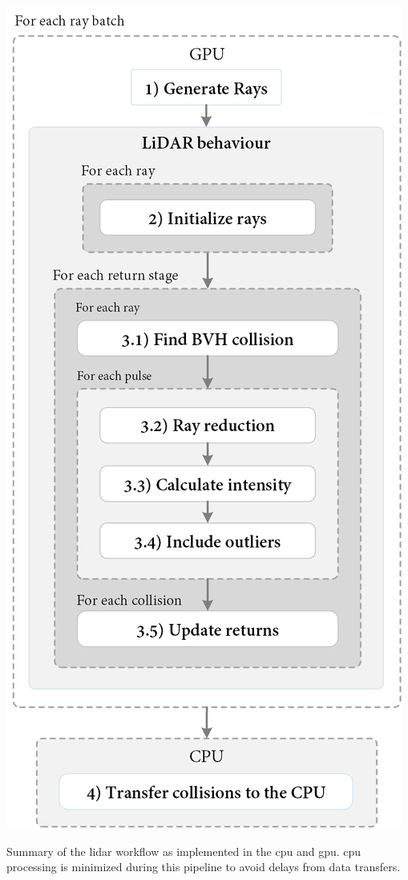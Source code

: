 \begin{marginfigure}[.0cm]
	\centering
	\includegraphics[width=\linewidth]{figs/lidar_simulation/lidar_overview.png}
	\caption{Summary of the \acrshort{lidar} workflow as implemented in the \acrshort{cpu} and \acrshort{gpu}. \acrshort{cpu} processing is minimized during this pipeline to avoid delays from data transfers.}
	\label{fig:lidar_workflow}
\end{marginfigure}

